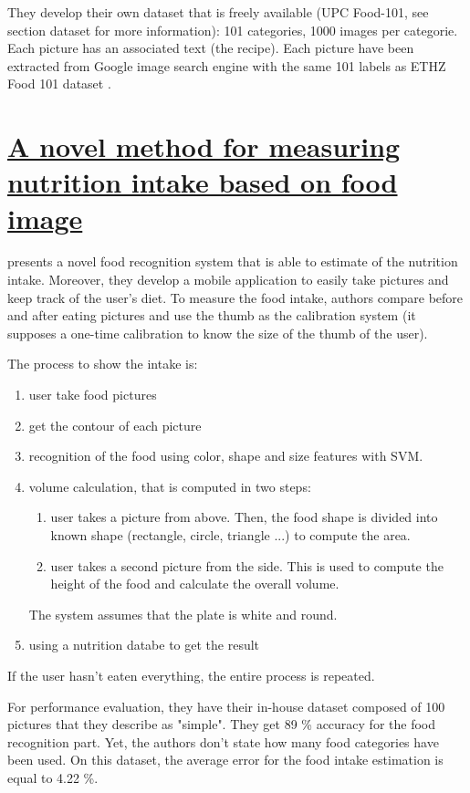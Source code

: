They develop their own dataset that is freely available (UPC Food-101, see section dataset for more information): 101 categories, 1000 images per categorie. Each picture has an associated text (the recipe).  Each picture have been extracted from Google image search engine with the same 101 labels as ETHZ Food 101 dataset \cite{Bossard2014}.

\section{\href{http://ieeexplore.ieee.org/xpls/abs_all.jsp?arnumber=6229581}{A novel method for measuring nutrition intake based on food image}}

\cite{Almaghrabi2012a} presents a novel food recognition system that is able to estimate of the nutrition intake. Moreover, they develop a mobile application to easily take pictures and keep track of the user's diet.
To measure the food intake, authors compare before and after eating pictures and use the thumb as the calibration system (it supposes a one-time calibration to know the size of the thumb of the user).

The process to show the intake is:
\begin{enumerate}
    \item user take food pictures
    \item get the contour of each picture
    \item recognition of the food using color, shape and size features with SVM.
    \item volume calculation, that is computed in two steps:
        \begin{enumerate}
            \item user takes a picture from above. Then, the food shape is divided into known shape (rectangle, circle, triangle ...) to compute the area.
            \item user takes a second picture from the side. This is used to compute the height of the food and calculate the overall volume.
        \end{enumerate}
    The system assumes that the plate is white and round.
    \item using a nutrition databe to get the result
\end{enumerate}

If the user hasn't eaten everything, the entire process is repeated.

For performance evaluation, they have their in-house dataset composed of 100 pictures that they describe as "simple". They get 89 \% accuracy for the food recognition part. Yet, the authors don't state how many food categories have been used. On this dataset, the average error for the food intake estimation is equal to 4.22 \%.

